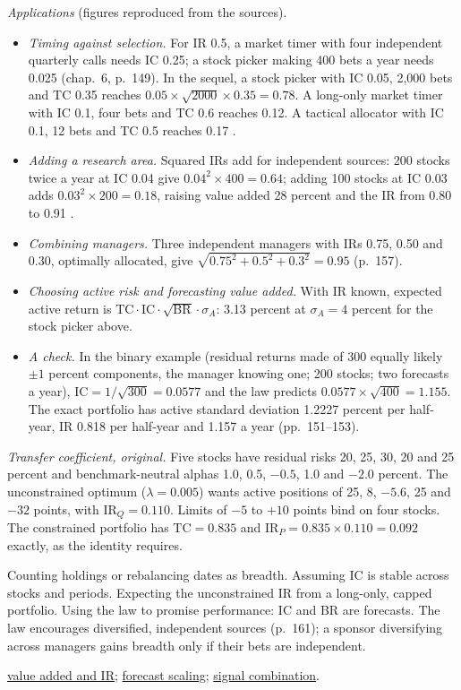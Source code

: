 \begin{qfresult}
 \emph{Applications} (figures reproduced from the sources).
\begin{itemize}
\item \emph{Timing against selection.} For IR 0.5, a market timer with four independent quarterly calls needs IC 0.25; a stock picker making 400 bets a year needs 0.025 (chap.~6, p.~149). In the sequel, a stock picker with IC 0.05, 2{,}000 bets and TC 0.35 reaches $0.05\times\sqrt{2000}\times0.35=0.78$. A long-only market timer with IC 0.1, four bets and TC 0.6 reaches 0.12. A tactical allocator with IC 0.1, 12 bets and TC 0.5 reaches 0.17 \citep[p.~29]{wide-grinold-kahn-advances}.
\item \emph{Adding a research area.} Squared IRs add for independent sources: 200 stocks twice a year at IC 0.04 give $0.04^2\times400=0.64$; adding 100 stocks at IC 0.03 adds $0.03^2\times200=0.18$, raising value added 28 percent and the IR from 0.80 to 0.91 \citep[chap.~6, p.~154]{alpha-grinold}.
\item \emph{Combining managers.} Three independent managers with IRs 0.75, 0.50 and 0.30, optimally allocated, give $\sqrt{0.75^2+0.5^2+0.3^2}=0.95$ (p.~157).
\item \emph{Choosing active risk and forecasting value added.} With IR known, expected active return is $\text{TC}\cdot\text{IC}\cdot\sqrt{\text{BR}}\cdot\sigma_A$: 3.13 percent at $\sigma_A=4$ percent for the stock picker above.
\item \emph{A check.} In the binary example (residual returns made of 300 equally likely $\pm1$ percent components, the manager knowing one; 200 stocks; two forecasts a year), $\text{IC}=1/\sqrt{300}=0.0577$ and the law predicts $0.0577\times\sqrt{400}=1.155$. The exact portfolio has active standard deviation 1.2227 percent per half-year, IR 0.818 per half-year and 1.157 a year (pp.~151--153).
\end{itemize}
\emph{Transfer coefficient, original.} Five stocks have residual risks 20, 25, 30, 20 and 25 percent and benchmark-neutral alphas 1.0, 0.5, $-0.5$, 1.0 and $-2.0$ percent. The unconstrained optimum ($\lambda=0.005$) wants active positions of 25, 8, $-5.6$, 25 and $-32$ points, with $\text{IR}_Q=0.110$. Limits of $-5$ to $+10$ points bind on four stocks. The constrained portfolio has $\text{TC}=0.835$ and $\text{IR}_P=0.835\times0.110=0.092$ exactly, as the identity requires.

 Counting holdings or rebalancing dates as breadth. Assuming IC is stable across stocks and periods. Expecting the unconstrained IR from a long-only, capped portfolio. Using the law to promise performance: IC and BR are forecasts. The law encourages diversified, independent sources (p.~161); a sponsor diversifying across managers gains breadth only if their bets are independent.

 \hyperref[meth:active-return-information-ratio]{value added and IR}; \hyperref[meth:forecast-scaling-ic]{forecast scaling}; \hyperref[meth:alpha-signal-combination]{signal combination}.

\end{qfresult}

